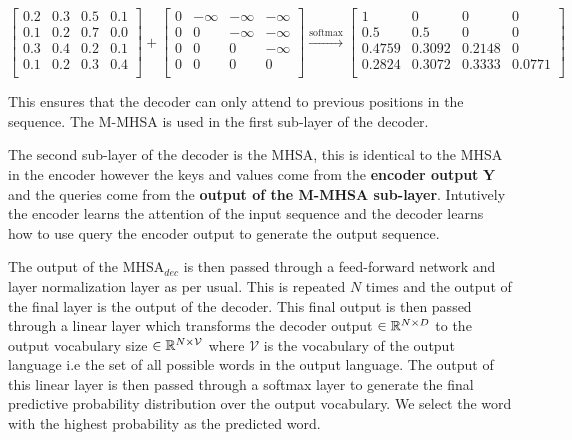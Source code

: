 \documentclass[../../main.tex]{subfiles}
\begin{document}
\begin{equation}
	\begin{bmatrix}
		0.2 & 0.3 & 0.5 & 0.1 \\
		0.1 & 0.2 & 0.7 & 0.0 \\
		0.3 & 0.4 & 0.2 & 0.1 \\
		0.1 & 0.2 & 0.3 & 0.4 \\
	\end{bmatrix} + 
	\begin{bmatrix}
		0 & -\infty & -\infty & -\infty \\
		0 & 0 & -\infty & -\infty \\
		0 & 0 & 0 & -\infty \\
		0 & 0 & 0 & 0 \\
	\end{bmatrix}
	\xrightarrow{\text{softmax}}
	\begin{bmatrix}
		1 & 0 & 0 & 0 \\
		0.5 & 0.5 & 0 & 0 \\
		0.4759 & 0.3092 & 0.2148 & 0 \\
		0.2824 & 0.3072 & 0.3333 & 0.0771 \\
	\end{bmatrix}
\end{equation}



This ensures that the decoder can only attend to previous positions in the sequence. The M-MHSA is used in the first sub-layer of the decoder. 

The second sub-layer of the decoder is the MHSA, this is identical to the MHSA in the encoder however the keys and values come from the \textbf{encoder output} $\bm{Y}$ and the queries come from the \textbf{output of the M-MHSA sub-layer}. Intutively the encoder learns the attention of the input sequence and the decoder learns how to use query the encoder output to generate the output sequence.

The output of the $\text{MHSA}_{dec}$ is then passed through a feed-forward network and layer normalization layer as per usual. This is repeated $N$ times and the output of the final layer is the output of the decoder. This final output is then passed through a linear layer which transforms the decoder output $\in \mathbb{R}^{N \times D}$ to the output vocabulary size $\in \mathbb{R}^{N \times \mathcal{V}}$ where $\mathcal{V}$ is the vocabulary of the output language i.e the set of all possible words in the output language. The output of this linear layer is then passed through a softmax layer to generate the final predictive probability distribution over the output vocabulary. We select the word with the highest probability as the predicted word.
\end{document}
